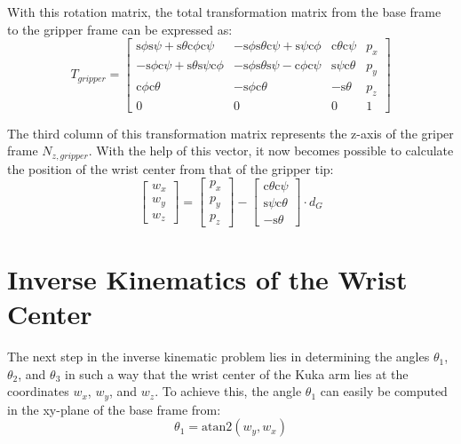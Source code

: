 \documentclass[twoside]{article}
\renewcommand{\c}{\text{c}}
\newcommand{\s}{\text{s}}
\begin{document}
With this rotation matrix, the total transformation matrix from the base frame to the gripper
frame can be expressed as:
\begin{equation}
  T_{gripper} =
  \begin{bmatrix}
     \s\phi\s\psi + \s\theta\c\phi\c\psi & -\s\phi\s\theta\c\psi + \s\psi\c\phi & \c\theta\c\psi & p_x \\
    -\s\phi\c\psi + \s\theta\s\psi\c\phi & -\s\phi\s\theta\s\psi - \c\phi\c\psi & \s\psi\c\theta & p_y \\
     \c\phi\c\theta                      & -\s\phi\c\theta                      & -\s\theta      & p_z \\
                                       0 &                                    0 &              0 &   1
  \end{bmatrix}
\end{equation}

The third column of this transformation matrix represents the z-axis of the griper frame $N_{z,gripper}$.
With the help of this vector, it now becomes possible to calculate the position of the wrist center
from that of the gripper tip:
\begin{equation}
  \begin{bmatrix}
    w_x \\ w_y \\ w_z
  \end{bmatrix}
  =
  \begin{bmatrix}
    p_x \\ p_y \\ p_z
  \end{bmatrix}
  -
  \begin{bmatrix}
    \c\theta\c\psi \\ \s\psi\c\theta \\ -\s\theta
  \end{bmatrix}
  \cdot d_G
\end{equation}


\section{Inverse Kinematics of the Wrist Center}
The next step in the inverse kinematic problem lies in determining the angles
$\theta_1$, $\theta_2$, and $\theta_3$ in such a way that the wrist center of the Kuka arm
lies at the coordinates $w_x$, $w_y$, and $w_z$. To achieve this, the angle $\theta_1$
can easily be computed in the xy-plane of the base frame from:
\begin{equation}
  \theta_1 = \text{atan2}(w_y, w_x)
\end{equation}
\end{document}
